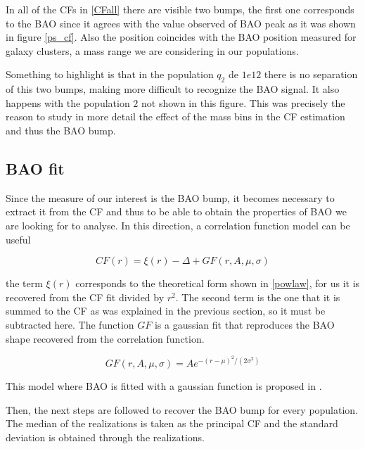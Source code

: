 In all of the CFs in \ref{CFall} there are visible two bumps, the first one
corresponds to the BAO since it agrees with the value observed of BAO
peak as it was shown in figure \ref{ps_cf}.
Also the position coincides with the BAO position measured for galaxy clusters, 
a mass range we are considering in our populations. 

Something to highlight is that in the population $q_2$ de $1e12$ 
there is no separation of this two bumps, making more difficult to recognize the BAO signal. 
It also happens with the population $2$ not shown in this figure. This 
was precisely the reason to study in more detail the effect of the mass bins in the CF estimation 
and thus the BAO bump. 


\subsection{BAO fit}

Since the measure of our interest is the BAO bump, it becomes necessary
to extract it from the CF and thus to be able to obtain the properties of 
BAO we are looking for to analyse. In this direction, a correlation function 
model can be useful  

\begin{equation}
CF(r) = \xi(r) - \Delta + GF(r,A,\mu,\sigma)
\end{equation}

the term $\xi(r)$ corresponds to the theoretical form shown in \ref{powlaw},
for us it is recovered from the CF fit divided by $r^2$. 
The second term is the one that it is summed to the CF as was explained
in the previous section, so it must be subtracted here. 
The function $GF$ is a gaussian fit that reproduces the BAO shape recovered 
from the correlation function. 

\[GF(r,A,\mu,\sigma) = Ae^{-(r-\mu)^2/(2\sigma^2)}\]

This model where BAO is fitted with a gaussian function is proposed in \cite{BAO_model}. 

Then, the next steps are followed to recover the BAO bump for every population. 
The median of the realizations is taken as the principal CF and the standard
deviation is obtained through the realizations.

